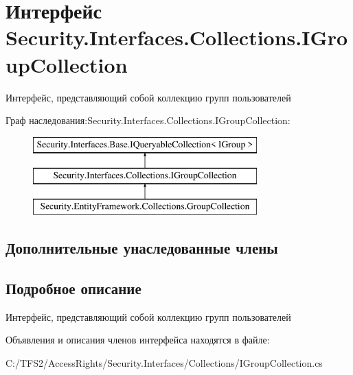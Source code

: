 \hypertarget{interface_security_1_1_interfaces_1_1_collections_1_1_i_group_collection}{}\section{Интерфейс Security.\+Interfaces.\+Collections.\+I\+Group\+Collection}
\label{interface_security_1_1_interfaces_1_1_collections_1_1_i_group_collection}


Интерфейс, представляющий собой коллекцию групп пользователей  


Граф наследования\+:Security.\+Interfaces.\+Collections.\+I\+Group\+Collection\+:\begin{figure}[H]
\begin{center}
\leavevmode
\includegraphics[height=3.000000cm]{d4/ddc/interface_security_1_1_interfaces_1_1_collections_1_1_i_group_collection}
\end{center}
\end{figure}
\subsection*{Дополнительные унаследованные члены}


\subsection{Подробное описание}
Интерфейс, представляющий собой коллекцию групп пользователей 



Объявления и описания членов интерфейса находятся в файле\+:\begin{DoxyCompactItemize}
\item 
C\+:/\+T\+F\+S2/\+Access\+Rights/\+Security.\+Interfaces/\+Collections/I\+Group\+Collection.\+cs\end{DoxyCompactItemize}
